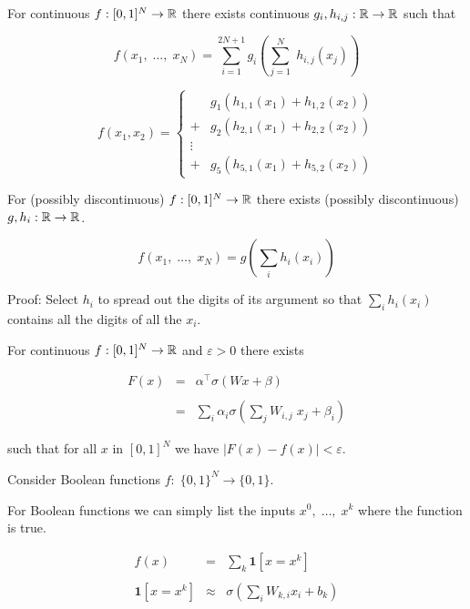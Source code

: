 {For continuous $f: [0,1]^N \rightarrow \mathbb{R}$ there exists continuous
$g_i,h_{i,j} : \mathbb{R} \rightarrow \mathbb{R}$ such that


\vfill
$$f(x_1,\;\ldots,\;x_N)=\sum _{{i=1}}^{{2N+1}} g_i \left(\sum_{j=1}^N\;h_{i,j}(x_j)\right)$$

\vfill
$$f(x_1,x_2) = \left\{\begin{array}{ll}& g_1(h_{1,1}(x_1) + h_{1,2}(x_2)) \\ + & g_2(h_{2,1}(x_1) + h_{2,2}(x_2)) \\ \vdots \\ + & g_5(h_{5,1}(x_1) + h_{5,2}(x_2))\end{array}\right.$$



For (possibly discontinuous) $f: [0,1]^N \rightarrow \mathbb{R}$ there exists (possibly discontinuous)
$g, h_i: \mathbb{R} \rightarrow \mathbb{R}$.

\vfill
$$f(x_1,\;\ldots,\;x_N) = g\left(\sum_i h_i(x_i)\right)$$

\vfill
Proof: Select $h_i$ to spread out the digits of its argument so that $\sum_i h_i(x_i)$ contains all the digits of all the $x_i$.


For continuous $f: [0,1]^N \rightarrow \mathbb{R}$ and $\varepsilon >0$ there exists

\vfill
\begin{eqnarray*}
  F(x) &= & \alpha^\top \sigma(Wx + \beta) \\
  \\
  & = & \sum_i \alpha_i \sigma\left(\sum_j W_{i,j} \;x_j + \beta_i\right)
\end{eqnarray*}


\vfill
such that for all $x$ in $[0,1]^N$ we have $| F( x ) - f ( x ) | < \varepsilon$.


Consider Boolean functions $f:\;\{0,1\}^N \rightarrow \{0,1\}$.

\vfill
For Boolean functions we can simply list the inputs $x^0,\;\ldots,\;x^k$ where the function is true.

\begin{eqnarray*}
  f(x) & = & \sum_k \mathbf{1}[x=x^k] \\
  \\
  \mathbf{1}[x = x^k] & \approx & \sigma\left(\sum_i W_{k,i} x_i + b_k\right)
\end{eqnarray*}

}
